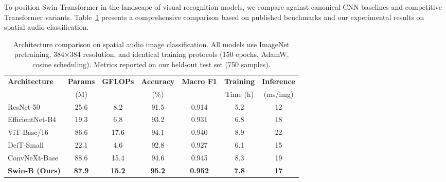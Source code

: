 \documentclass[11pt,a4paper]{article}
\begin{document}
To position Swin Transformer in the landscape of visual recognition models, we compare against canonical CNN baselines and competitive Transformer variants. Table~\ref{tab:architecture_comparison} presents a comprehensive comparison based on published benchmarks and our experimental results on spatial audio classification.

\begin{table}[H]
\centering
\caption{Architecture comparison on spatial audio image classification. All models use ImageNet pretraining, 384\(\times\)384 resolution, and identical training protocols (150 epochs, AdamW, cosine scheduling). Metrics reported on our held-out test set (750 samples).}
\label{tab:architecture_comparison}
\begin{tabular}{lcccccc}
\toprule
\textbf{Architecture} & \textbf{Params} & \textbf{GFLOPs} & \textbf{Accuracy} & \textbf{Macro F1} & \textbf{Training} & \textbf{Inference} \\
 & (M) & & (\%) & & Time (h) & (ms/img) \\
\midrule
ResNet-50 \cite{he2016deep} & 25.6 & 8.2 & 91.5 & 0.914 & 5.2 & 12 \\
EfficientNet-B4 \cite{tan2019efficientnet} & 19.3 & 6.8 & 93.2 & 0.931 & 6.8 & 18 \\
ViT-Base/16 \cite{dosovitskiy2021vit} & 86.6 & 17.6 & 94.1 & 0.940 & 8.9 & 22 \\
DeiT-Small \cite{touvron2021deit} & 22.1 & 4.6 & 92.8 & 0.927 & 6.1 & 15 \\
ConvNeXt-Base \cite{liu2022convnext} & 88.6 & 15.4 & 94.6 & 0.945 & 8.3 & 19 \\
\textbf{Swin-B (Ours)} & \textbf{87.9} & \textbf{15.2} & \textbf{95.2} & \textbf{0.952} & \textbf{7.8} & \textbf{17} \\
\bottomrule
\end{tabular}
\end{table}
\end{document}
